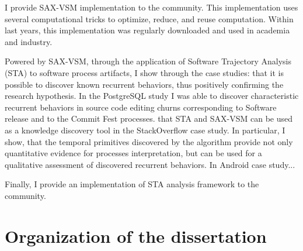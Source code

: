 I provide SAX-VSM implementation to the community. This implementation uses several computational tricks to optimize,
reduce, and reuse computation. Within last years, this implementation was regularly downloaded and used in academia and
industry. 

Powered by SAX-VSM, through the application of Software Trajectory Analysis (STA) to software process artifacts, I show
through the case studies: that it is possible to discover known recurrent behaviors, thus positively confirming the
research hypothesis. In the PostgreSQL study I was able to discover characteristic recurrent behaviors in source code
editing churns corresponding
to Software release and to the Commit Fest processes.
that STA and SAX-VSM can be used as a knowledge discovery tool in the StackOverflow case study. In particular, I show,
that the temporal primitives discovered by the algorithm provide not only quantitative evidence for processes
interpretation, but can be used for a qualitative assessment of discovered recurrent behaviors.
In Android case study...

Finally, I provide an implementation of STA analysis framework to the community. 

\section{Organization of the dissertation}\label{section_organization}